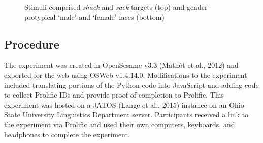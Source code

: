 \documentclass[
  letterpaper,
  DIV=11,
  numbers=noendperiod]{scrartcl}
\begin{document}
\begin{figure}


\caption{\label{fig-visual}Stimuli comprised \emph{shack} and
\emph{sack} targets (top) and gender-protypical `male' and `female'
faces (bottom)}

\end{figure}%

\subsection{Procedure}\label{sec-procedure}

The experiment was created in OpenSesame v3.3 (Mathôt et al., 2012) and
exported for the web using OSWeb v1.4.14.0. Modifications to the
experiment included translating portions of the Python code into
JavaScript and adding code to collect Prolific IDs and provide proof of
completion to Prolific. This experiment was hosted on a JATOS (Lange et
al., 2015) instance on an Ohio State University Linguistics Department
server. Participants received a link to the experiment via Prolific and
used their own computers, keyboards, and headphones to complete the
experiment.
\end{document}
